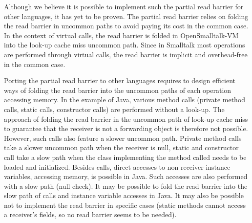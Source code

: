 \documentclass[sigplan,10pt,review,anonymous]{acmart}\settopmatter{printfolios=true,printccs=false,printacmref=false}
\def\OpenSmalltalkVM{OpenSmalltalk-VM\xspace}
\begin{document}
Although we believe it is possible to implement such the partial read barrier for other languages, it has yet to be proven. The partial read barrier relies on folding the read barrier in uncommon paths to avoid paying its cost in the common case. In the context of virtual calls, the read barrier is folded in \OpenSmalltalkVM into the look-up cache miss uncommon path. Since in Smalltalk most operations are performed through virtual calls, the read barrier is implicit and overhead-free in the common case. 

Porting the partial read barrier to other languages requires to design efficient ways of folding the read barrier into the uncommon paths of each operation accessing memory. In the example of Java, various method calls (private method calls, static calls, constructor calls) are performed without a look-up. The approach of folding the read barrier in the uncommon path of look-up cache miss to guarantee that the receiver is not a forwarding object is therefore not possible. However, such calls also feature a slower uncommon path. Private method calls take a slower uncommon path when the receiver is null, static and constructor call take a slow path when the class implementing the method called needs to be loaded and initialized. Besides calls, direct accesses to non receiver instance variables, accessing memory, is possible in Java. Such accesses are also performed with a slow path (null check). It may be possible to fold the read barrier into the slow path of calls and instance variable accesses in Java. It may also be possible not to implement the read barrier in specific cases (static methods cannot access a receiver's fields, so no read barrier seems to be needed).
\end{document}
